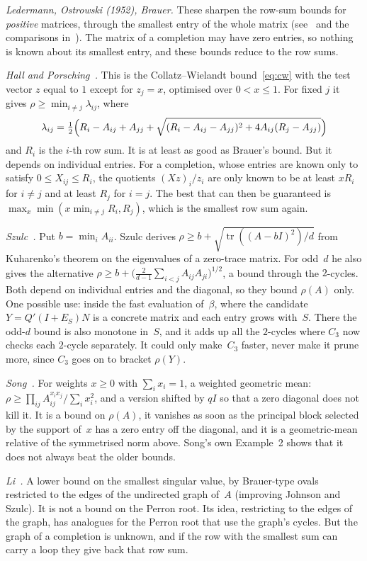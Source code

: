 \documentclass[11pt]{amsart}
\newcommand{\lam}{\lambda}
\newcommand{\tr}{\operatorname{tr}}
\theoremstyle{plain}
\theoremstyle{definition}
\begin{document}
\emph{Ledermann, Ostrowski (1952), Brauer.}  These sharpen the row-sum
bounds for \emph{positive} matrices, through the smallest entry of the
whole matrix (see~\cite[p.~65]{Seneta} and the comparisons
in~\cite{Song92}).  The matrix of a completion may have zero entries, so
nothing is known about its smallest entry, and these bounds reduce to the
row sums.

\emph{Hall and Porsching~\cite{HallPorsching}.}  This is the
Collatz--Wielandt bound~\eqref{eq:cw} with the test vector $z$ equal to
$1$ except for $z_j=x$, optimised over $0<x\le1$.  For fixed $j$ it gives
$\rho\ge\min_{i\ne j}\lam_{ij}$, where
\[
  \lam_{ij}=\tfrac12\Bigl(R_i-A_{ij}+A_{jj}
  +\sqrt{(R_i-A_{ij}-A_{jj})^2+4A_{ij}(R_j-A_{jj})}\Bigr)
\]
and $R_i$ is the $i$-th row sum.  It is at least as good as Brauer's
bound.  But it depends on individual entries.  For a completion, whose
entries are known only to satisfy $0\le X_{ij}\le R_i$, the quotients
$(Xz)_i/z_i$ are only known to be at least $xR_i$ for $i\ne j$ and at
least $R_j$ for $i=j$.  The best that can then be guaranteed is
$\max_x\min(x\min_{i\ne j}R_i,R_j)$, which is the smallest row sum again.

\emph{Szulc~\cite{Szulc88}.}  Put $b=\min_iA_{ii}$.  Szulc derives
$\rho\ge b+\sqrt{\tr((A-bI)^2)/d}$ from Kuharenko's theorem on the
eigenvalues of a zero-trace matrix.  For odd~$d$ he also gives the
alternative $\rho\ge b+\bigl(\frac2{d-1}\sum_{i<j}A_{ij}A_{ji}\bigr)^{1/2}$,
a bound through the $2$-cycles.  Both depend on individual entries and
the diagonal, so they bound $\rho(A)$ only.  One possible use: inside the
fast evaluation of~$\beta$, where the candidate $Y=Q'(I+E_S)N$ is a
concrete matrix and each entry grows with~$S$.  There the odd-$d$ bound is
also monotone in~$S$, and it adds up all the $2$-cycles where $C_3$ now
checks each $2$-cycle separately.  It could only make~$C_3$ faster, never
make it prune more, since $C_3$ goes on to bracket $\rho(Y)$.

\emph{Song~\cite{Song92}.}  For weights $x\ge0$ with $\sum_ix_i=1$, a
weighted geometric mean: $\rho\ge\prod_{ij}A_{ij}^{x_ix_j}/\sum_ix_i^2$,
and a version shifted by $qI$ so that a zero diagonal does not kill it.  It
is a bound on $\rho(A)$, it vanishes as soon as the principal block
selected by the support of~$x$ has a zero entry off the diagonal, and it
is a geometric-mean relative of the symmetrised norm above.  Song's own
Example~2 shows that it does not always beat the older bounds.

\emph{Li~\cite{Li01}.}  A lower bound on the smallest singular value, by
Brauer-type ovals restricted to the edges of the undirected graph of~$A$
(improving Johnson and Szulc).  It is not a bound on the Perron root.  Its
idea, restricting to the edges of the graph, has analogues for the Perron
root that use the graph's cycles.  But the graph of a completion is
unknown, and if the row with the smallest sum can carry a loop they give
back that row sum.
\end{document}
